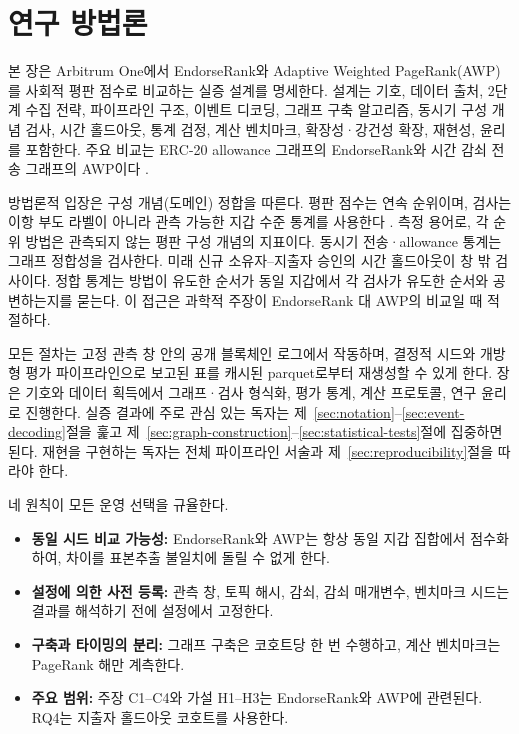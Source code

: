 ﻿%
\chapter{연구 방법론}
\label{ch:methodology}

본 장은 Arbitrum One에서 EndorseRank와 Adaptive Weighted PageRank(AWP)를 사회적 평판 점수로 비교하는 실증 설계를 명세한다. 설계는 기호, 데이터 출처, 2단계 수집 전략, 파이프라인 구조, 이벤트 디코딩, 그래프 구축 알고리즘, 동시기 구성 개념 검사, 시간 홀드아웃, 통계 검정, 계산 벤치마크, 확장성·강건성 확장, 재현성, 윤리를 포함한다. 주요 비교는 ERC-20 allowance 그래프의 EndorseRank와 시간 감쇠 전송 그래프의 AWP이다 .

방법론적 입장은 구성 개념(도메인) 정합을 따른다. 평판 점수는 연속 순위이며, 검사는 이항 부도 라벨이 아니라 관측 가능한 지갑 수준 통계를 사용한다 . 측정 용어로, 각 순위 방법은 관측되지 않는 평판 구성 개념의 지표이다. 동시기 전송·allowance 통계는 그래프 정합성을 검사한다. 미래 신규 소유자--지출자 승인의 시간 홀드아웃이 창 밖 검사이다. 정합 통계는 방법이 유도한 순서가 동일 지갑에서 각 검사가 유도한 순서와 공변하는지를 묻는다. 이 접근은 과학적 주장이 EndorseRank 대 AWP의 비교일 때 적절하다.

모든 절차는 고정 관측 창 안의 공개 블록체인 로그에서 작동하며, 결정적 시드와 개방형 평가 파이프라인으로 보고된 표를 캐시된 parquet로부터 재생성할 수 있게 한다. 장은 기호와 데이터 획득에서 그래프·검사 형식화, 평가 통계, 계산 프로토콜, 연구 윤리로 진행한다. 실증 결과에 주로 관심 있는 독자는 제~\ref{sec:notation}--\ref{sec:event-decoding}절을 훑고 제~\ref{sec:graph-construction}--\ref{sec:statistical-tests}절에 집중하면 된다. 재현을 구현하는 독자는 전체 파이프라인 서술과 제~\ref{sec:reproducibility}절을 따라야 한다.

네 원칙이 모든 운영 선택을 규율한다.
\begin{itemize}
\item \textbf{동일 시드 비교 가능성:} EndorseRank와 AWP는 항상 동일 지갑 집합에서 점수화하여, 차이를 표본추출 불일치에 돌릴 수 없게 한다.
\item \textbf{설정에 의한 사전 등록:} 관측 창, 토픽 해시, 감쇠, 감쇠 매개변수, 벤치마크 시드는 결과를 해석하기 전에 설정에서 고정한다.
\item \textbf{구축과 타이밍의 분리:} 그래프 구축은 코호트당 한 번 수행하고, 계산 벤치마크는 PageRank 해만 계측한다.
\item \textbf{주요 범위:} 주장 C1--C4와 가설 H1--H3는 EndorseRank와 AWP에 관련된다. RQ4는 지출자 홀드아웃 코호트를 사용한다.
\end{itemize}

